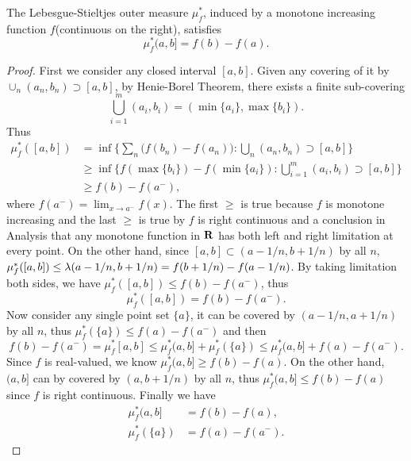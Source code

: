 \begin{pro}%
	The Lebesgue-Stieltjes outer measure $\mu_f^*$, induced by a monotone increasing function $f$(continuous on the right), satisfies
	\[\mu_f^*(a,b]=f(b)-f(a).\]
\end{pro}
\begin{proof}
	First we consider any closed interval $[a,b]$. Given any covering of it by $\cup_n (a_n,b_n)\supset [a,b]$, by Henie-Borel Theorem, there exists a finite sub-covering
	\[\bigcup_{i=1}^m (a_i,b_i)=(\min\{a_i\},\max\{b_i\}).\]
	Thus
	\begin{align*}
		\mu_f^*([a,b])&=\inf\{\sum_n \big(f(b_n)-f(a_n)\big)\colon \bigcup_n (a_n,b_n)\supset [a,b]\}\\
		&\geq\inf\{f(\max\{b_i\})-f(\min\{a_i\})\colon \bigcup_{i=1}^m (a_i,b_i)\supset [a,b]\}\\
		&\geq f(b)-f(a^-),
	\end{align*}
	where $f(a^-)=\lim_{x\to a^-} f(x)$.
	The first $\geq$ is true because $f$ is monotone increasing and the last $\geq$ is true by $f$ is right continuous and a conclusion in Analysis that any monotone function in $\mathbf{R}$ has both left and right limitation at every point. On the other hand, since $[a,b]\subset (a-1/n,b+1/n)$ by all $n$, $\mu_f^*([a,b])\leq \lambda(a-1/n,b+1/n)=f(b+1/n)-f(a-1/n)$. By taking limitation both sides, we have $\mu_f^*([a,b])\leq f(b)-f(a^-)$, thus
	\[\mu_f^*([a,b])=f(b)-f(a^-).\]
	Now consider any single point set $\{a\}$, it can be covered by $(a-1/n,a+1/n)$ by all $n$, thus $\mu_f^*(\{a\})\leq f(a)-f(a^-)$ and then
	\[f(b)-f(a^-)=\mu_f^*[a,b]\leq \mu_f^*(a,b]+\mu_f^*(\{a\})\leq \mu_f^*(a,b]+f(a)-f(a^-).\]
	Since $f$ is real-valued, we know $\mu_f^*(a,b]\geq f(b)-f(a)$. On the other hand, $(a,b]$ can by covered by $(a,b+1/n)$ by all $n$, thus $\mu_f^*(a,b]\leq f(b)-f(a)$ since $f$ is right continuous. Finally we have
	\begin{align*}
		\mu_f^*(a,b]&=f(b)-f(a),\\
		\mu_f^*(\{a\})&=f(a)-f(a^-).
	\end{align*}
\end{proof}

